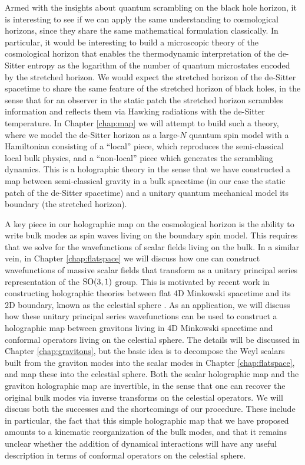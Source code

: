 \documentclass{brownthesis}
\begin{document}
Armed with the insights about quantum scrambling on the black hole horizon, it is interesting to see if we can apply the same understanding to cosmological horizons, since they share the same mathematical formulation classically. In particular, it would be interesting to build a microscopic theory of the cosmological horizon that enables the thermodynamic interpretation of the de-Sitter entropy as the logarithm of the number of quantum microstates encoded by the stretched horizon. We would expect the stretched horizon of the de-Sitter spacetime to share the same feature of the stretched horizon of black holes, in the sense that for an observer in the static patch the stretched horizon scrambles information and reflects them via Hawking radiations with the de-Sitter temperature. In Chapter \ref{chap:map} we will attempt to build such a theory, where we model the de-Sitter horizon as a large-$N$ quantum spin model with a Hamiltonian consisting of a ``local'' piece, which reproduces the semi-classical local bulk physics, and a ``non-local'' piece which generates the scrambling dynamics. This is a holographic theory in the sense that we have constructed a map between semi-classical gravity in a bulk spacetime (in our case the static patch of the de-Sitter spacetime) and a unitary quantum mechanical model its boundary (the stretched horizon).

A key piece in our holographic map on the cosmological horizon is the ability to write bulk modes as spin waves living on the boundary spin model. This requires that we solve for the wavefunctions of scalar fields living on the bulk. In a similar vein, in Chapter \ref{chap:flatspace} we will discuss how one can construct wavefunctions of massive scalar fields that transform as a unitary principal series representation of the $\rm SO(3,1)$ group. This is motivated by recent work in constructing holographic theories between flat 4D Minkowski spacetime and its 2D boundary, known as the celestial sphere \cite{deBoer:2003vf,Kapec:2014opa,Kapec:2016jld,Cheung:2016iub}. As an application, we will discuss how these unitary principal series wavefunctions can be used to construct a holographic map between gravitons living in 4D Minkowski spacetime and conformal operators living on the celestial sphere. The details will be discussed in Chapter \ref{chap:gravitons}, but the basic idea is to decompose the Weyl scalars built from the graviton modes into the scalar modes in Chapter \ref{chap:flatspace}, and map these into the celestial sphere. Both the scalar holographic map and the graviton holographic map are invertible, in the sense that one can recover the original bulk modes via inverse transforms on the celestial operators. We will discuss both the successes and the shortcomings of our procedure. These include in particular, the fact that this simple holographic map that we have proposed amounts to a kinematic reorganization of the bulk modes, and that it remains unclear whether the addition of dynamical interactions will have any useful description in terms of conformal operators on the celestial sphere.
\end{document}
